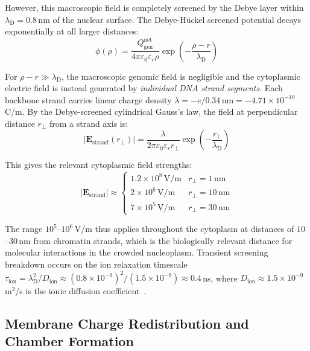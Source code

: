 \documentclass[11pt,twocolumn,a4paper]{article}
\theoremstyle{definition}
\theoremstyle{remark}
\newcommand{\lD}{\lambda_{\mathrm{D}}}
\newcommand{\Qgen}{Q_{\mathrm{gen}}}
\newcommand{\eps}{\varepsilon}
\newcommand{\epsz}{\varepsilon_{0}}
\newcommand{\vv}[1]{\boldsymbol{#1}}
\newcommand{\abs}[1]{\left|#1\right|}
\begin{document}
However, this macroscopic field is completely screened by the Debye layer within $\lD = 0.8$\,nm of the nuclear surface. The Debye-H\"{u}ckel screened potential decays exponentially at all larger distances:
\begin{equation}
  \phi(\rho) = \frac{\Qgen^{\mathrm{net}}}{4\pi \epsz \eps_r \rho} \exp\!\left(-\frac{\rho - r}{\lD}\right)
  \label{eq:screened_potential}
\end{equation}

For $\rho - r \gg \lD$, the macroscopic genomic field is negligible and the cytoplasmic electric field is instead generated by \emph{individual DNA strand segments}. Each backbone strand carries linear charge density $\lambda = -e/0.34\,\mathrm{nm} = -4.71 \times 10^{-10}$\,C/m. By the Debye-screened cylindrical Gauss's law, the field at perpendicular distance $r_\perp$ from a strand axis is:
\begin{equation}
  \abs{\vv{E}_{\mathrm{strand}}(r_\perp)} = \frac{\lambda}{2\pi \epsz \eps_r r_\perp} \exp\!\left(-\frac{r_\perp}{\lD}\right)
  \label{eq:strand_field}
\end{equation}

This gives the relevant cytoplasmic field strengths:
\begin{equation}
  \abs{\vv{E}_{\mathrm{strand}}} \approx
  \begin{cases}
    1.2 \times 10^8\,\mathrm{V/m} & r_\perp = 1\,\mathrm{nm} \\
    2 \times 10^6\,\mathrm{V/m}   & r_\perp = 10\,\mathrm{nm} \\
    7 \times 10^5\,\mathrm{V/m}   & r_\perp = 30\,\mathrm{nm}
  \end{cases}
\end{equation}

The range $10^5$--$10^6$\,V/m thus applies throughout the cytoplasm at distances of $10$--$30$\,nm from chromatin strands, which is the biologically relevant distance for molecular interactions in the crowded nucleoplasm. Transient screening breakdown occurs on the ion relaxation timescale $\tau_{\mathrm{ion}} = \lD^2 / D_{\mathrm{ion}} \approx (0.8 \times 10^{-9})^2 / (1.5 \times 10^{-9}) \approx 0.4$\,ns, where $D_{\mathrm{ion}} \approx 1.5 \times 10^{-9}$\,m$^2$/s is the ionic diffusion coefficient~\cite{Hille2001}.

\subsection{Membrane Charge Redistribution and Chamber Formation}
\end{document}

